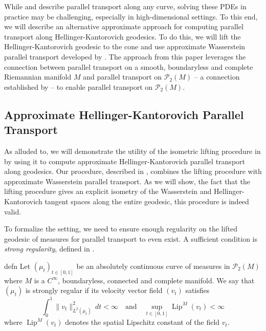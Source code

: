 \documentclass[11pt]{article}
\newcommand{\man}{M}
\begin{document}
While  and  describe parallel transport along any curve, solving these PDEs in practice may be challenging, especially in high-dimensional settings. To this end, we will describe an alternative approximate approach for computing parallel transport along Hellinger-Kantorovich geodesics. To do this, we will lift the Hellinger-Kantorovich geodesic to the cone and use approximate Wasserstein parallel transport developed by \citet{saidi2026wassersteinparalleltransportpredicting}. The approach from this paper leverages the connection between parallel transport on a smooth, boundaryless and complete Riemannian manifold $\man$ and parallel transport on $\mathcal{P}_{2}(\man)$ -- a connection established by \citet{gigli2012second} -- to enable parallel transport on $\mathcal{P}_2(\man)$. 


\subsection{Approximate Hellinger-Kantorovich Parallel Transport}

As alluded to, we will demonstrate the utility of the isometric lifting procedure in  by using it to compute approximate Hellinger-Kantorovich parallel transport along geodesics. Our procedure, described in , combines the lifting procedure with approximate Wasserstein parallel transport. As we will show, the fact that the lifting procedure gives an explicit isometry of the Wasserstein and Hellinger-Kantorovich tangent spaces along the entire geodesic, this procedure is indeed valid. 

To formalize the setting, we need to ensure enough regularity on the lifted geodesic of measures for parallel transport to even exist. A sufficient condition is \textit{strong regularity}, defined in . 

\begin{restatable}{defn}{} \label{strong regularity}
    Let $(\mu_t)_{t \in [0,1]}$ be an absolutely continuous curve of measures in $\mathcal{P}_2(\man)$ where $\man$ is a $C^\infty$, boundaryless, connected and complete manifold. We say that $(\mu_t)$ is strongly regular if its velocity vector field $(v_t)$ satisfies 
    \[\int_0^1\|v_t\|_{L^2(\mu_t)}^2\,dt < \infty \quad \text{and} \quad \sup_{t\in [0,1]}\operatorname{Lip}^\man(v_t) < \infty\]
    where $\operatorname{Lip}^\man(v_t)$ denotes the spatial Lipschitz constant of the field $v_t$. 
\end{restatable}
\end{document}
